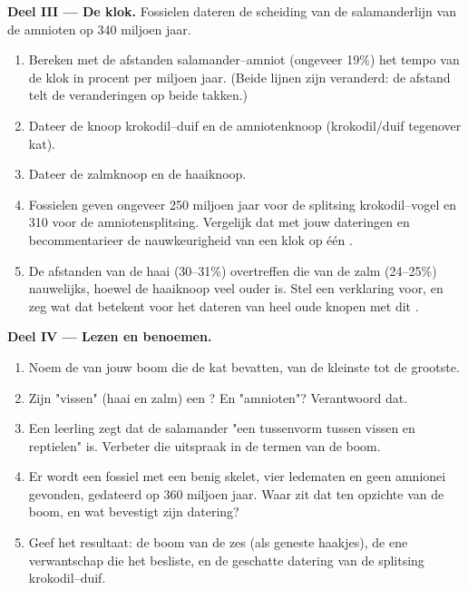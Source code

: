 \begin{problem}
\medskip
\noindent\textbf{Deel III --- De klok.}
Fossielen dateren de scheiding van de salamanderlijn van de amnioten op
340 miljoen jaar.
\begin{enumerate}[resume]
  \item Bereken met de afstanden salamander--amniot (ongeveer 19\%) het
        tempo van de klok in procent per miljoen jaar. (Beide lijnen zijn
        veranderd: de afstand telt de veranderingen op beide takken.)
  \item Dateer de knoop krokodil--duif en de amniotenknoop (krokodil/duif
        tegenover kat).
  \item Dateer de zalmknoop en de haaiknoop.
  \item Fossielen geven ongeveer 250 miljoen jaar voor de splitsing
        krokodil--vogel en 310 voor de amniotensplitsing. Vergelijk dat
        met jouw dateringen en becommentarieer de nauwkeurigheid van een
        klok op één .
  \item De afstanden van de haai (30--31\%) overtreffen die van de zalm
        (24--25\%) nauwelijks, hoewel de haaiknoop veel ouder is. Stel een
        verklaring voor, en zeg wat dat betekent voor het dateren van heel
        oude knopen met dit .
\end{enumerate}

\medskip
\noindent\textbf{Deel IV --- Lezen en benoemen.}
\begin{enumerate}[resume]
  \item Noem de  van jouw boom die de kat bevatten, van de kleinste
        tot de grootste.
  \item Zijn "vissen" (haai en zalm) een ? En "amnioten"?
        Verantwoord dat.
  \item Een leerling zegt dat de salamander "een tussenvorm tussen vissen
        en reptielen" is. Verbeter die uitspraak in de termen van de boom.
  \item Er wordt een fossiel met een benig skelet, vier ledematen en geen
        amnionei gevonden, gedateerd op 360 miljoen jaar. Waar zit dat ten
        opzichte van de boom, en wat bevestigt zijn datering?
  \item Geef het resultaat: de boom van de zes  (als geneste
        haakjes), de ene verwantschap die het  besliste, en de
        geschatte datering van de splitsing krokodil--duif.
\end{enumerate}
\end{problem}
